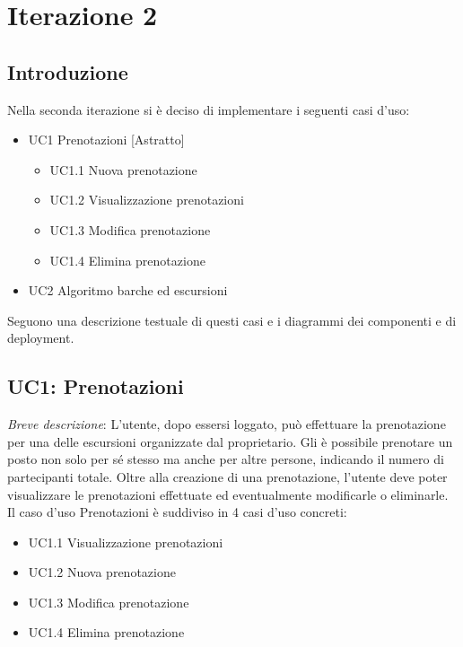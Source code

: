 \section{Iterazione 2}

\subsection{Introduzione}
Nella seconda iterazione si è deciso di implementare i seguenti casi d'uso:

\begin{itemize}
    \item UC1 Prenotazioni [Astratto]
    \begin{itemize}
        \item UC1.1 Nuova prenotazione
        \item UC1.2 Visualizzazione prenotazioni
        \item UC1.3 Modifica prenotazione
        \item UC1.4 Elimina prenotazione
    \end{itemize}
    \item UC2 Algoritmo barche ed escursioni
\end{itemize}

Seguono una descrizione testuale di questi casi e i diagrammi dei componenti e di deployment.

\subsection{UC1: Prenotazioni}
\emph{Breve descrizione}: L'utente, dopo essersi loggato, può effettuare la prenotazione per una delle escursioni organizzate dal proprietario. Gli è possibile prenotare un posto non solo per sé stesso ma anche per altre persone, indicando il numero di partecipanti totale. Oltre alla creazione di una prenotazione, l'utente deve poter visualizzare le prenotazioni effettuate ed eventualmente modificarle o eliminarle.
Il caso d'uso Prenotazioni è suddiviso in 4 casi d'uso concreti:

\begin{itemize}
    \item UC1.1 Visualizzazione prenotazioni 
    \item UC1.2 Nuova prenotazione
    \item UC1.3 Modifica prenotazione
    \item UC1.4 Elimina prenotazione
\end{itemize}

